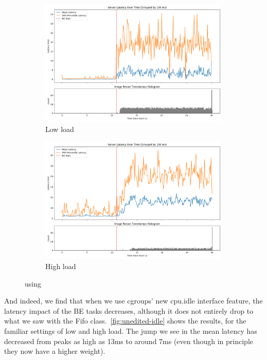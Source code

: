 \begin{figure}[t]
    \centering
    \begin{subfigure}[t]{0.49\columnwidth}
        \includegraphics[width=\columnwidth]{graphs/unedited-idle-low-two.png}
        \caption{Low load}\label{fig:unedited-idle-low-two}
    \end{subfigure}
    \hspace{\fill}
    \begin{subfigure}[t]{0.49\columnwidth}
        \includegraphics[width=\columnwidth]{graphs/unedited-idle-high-two.png}
        \caption{High load}\label{fig:unedited-idle-high-two}
    \end{subfigure}
    \vspace{4pt}
    \caption{using \schedidle{}}\label{fig:unedited-idle}
\end{figure}

And indeed, we find that when we use cgroups' new cpu.idle interface feature,
the latency impact of the BE tasks decreases, although it does not entirely drop
to what we saw with the Fifo class.\ \autoref{fig:unedited-idle} shows the
results, for the familiar settings of low and high load. The jump we see in the
mean latency has decreased from peaks as high as 13ms to around 7ms (even though
in principle they now have a higher weight).


